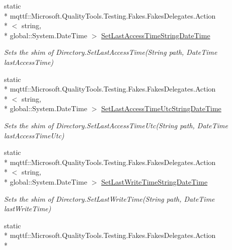 \begin{DoxyCompactItemize}
static \\*
mqttf\-::\-Microsoft.\-Quality\-Tools.\-Testing.\-Fakes.\-Fakes\-Delegates.\-Action\\*
$<$ string, \\*
global\-::\-System.\-Date\-Time $>$ \hyperlink{class_system_1_1_i_o_1_1_fakes_1_1_shim_directory_afacc7119ba0187ff06e5199c2dd9f7f4}{Set\-Last\-Access\-Time\-String\-Date\-Time}
\begin{DoxyCompactList}\small\item\em Sets the shim of Directory.\-Set\-Last\-Access\-Time(\-String path, Date\-Time last\-Access\-Time)\end{DoxyCompactList}\item 
static \\*
mqttf\-::\-Microsoft.\-Quality\-Tools.\-Testing.\-Fakes.\-Fakes\-Delegates.\-Action\\*
$<$ string, \\*
global\-::\-System.\-Date\-Time $>$ \hyperlink{class_system_1_1_i_o_1_1_fakes_1_1_shim_directory_a0bdb60a4f254837361b282ab11172132}{Set\-Last\-Access\-Time\-Utc\-String\-Date\-Time}
\begin{DoxyCompactList}\small\item\em Sets the shim of Directory.\-Set\-Last\-Access\-Time\-Utc(\-String path, Date\-Time last\-Access\-Time\-Utc)\end{DoxyCompactList}\item 
static \\*
mqttf\-::\-Microsoft.\-Quality\-Tools.\-Testing.\-Fakes.\-Fakes\-Delegates.\-Action\\*
$<$ string, \\*
global\-::\-System.\-Date\-Time $>$ \hyperlink{class_system_1_1_i_o_1_1_fakes_1_1_shim_directory_a407fbf4015a7f0dd73ecb6055c2c6ec7}{Set\-Last\-Write\-Time\-String\-Date\-Time}
\begin{DoxyCompactList}\small\item\em Sets the shim of Directory.\-Set\-Last\-Write\-Time(\-String path, Date\-Time last\-Write\-Time)\end{DoxyCompactList}\item 
static \\*
mqttf\-::\-Microsoft.\-Quality\-Tools.\-Testing.\-Fakes.\-Fakes\-Delegates.\-Action\\*

\end{DoxyCompactItemize}
